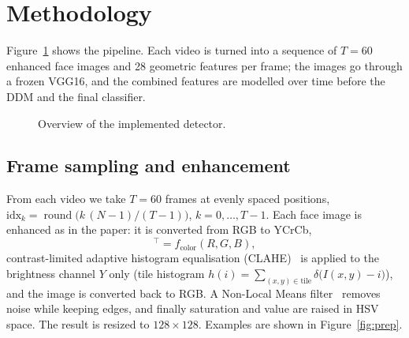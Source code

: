 \documentclass[11pt,a4paper]{article}
\begin{document}
\section{Methodology}
Figure~\ref{fig:pipeline} shows the pipeline. Each video is turned into a sequence of $T=60$ enhanced face images and 28 geometric features per frame; the images go through a frozen VGG16, and the combined features are modelled over time before the DDM and the final classifier.

\begin{figure}[H]
\centering
{}
\caption{Overview of the implemented detector.}
\label{fig:pipeline}
\end{figure}

\subsection{Frame sampling and enhancement}
From each video we take $T=60$ frames at evenly spaced positions, $\text{idx}_k=\operatorname{round}\big(k\,(N-1)/(T-1)\big)$, $k=0,\dots,T-1$. Each face image is enhanced as in the paper: it is converted from RGB to YCrCb,
\begin{equation}
[Y,\,C_r,\,C_b]^{\top}=f_{\text{color}}(R,G,B),
\end{equation}
contrast-limited adaptive histogram equalisation (CLAHE)~\cite{clahe} is applied to the brightness channel $Y$ only (tile histogram $h(i)=\sum_{(x,y)\in \text{tile}}\delta\big(I(x,y)-i\big)$), and the image is converted back to RGB. A Non-Local Means filter~\cite{nlm} removes noise while keeping edges, and finally saturation and value are raised in HSV space. The result is resized to $128\times128$. Examples are shown in Figure~\ref{fig:prep}.
\end{document}

